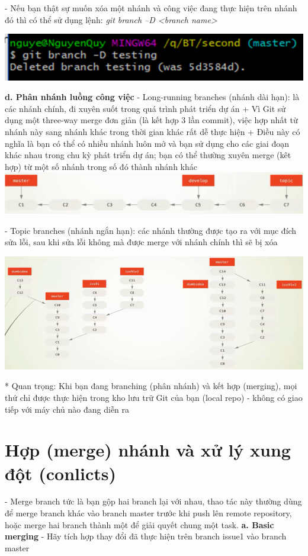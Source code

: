 \documentclass[12pt,a4paper]{report}
\begin{document}
	\label{fig:screenshot056}
\vskip 0.4cm\vskip 0.4cm
- Nếu bạn thật sự muốn xóa một nhánh và công việc đang thực hiện trên nhánh đó thì có thể sử dụng lệnh: {\it git branch –D <branch name>}\vskip 0.4cm

	\includegraphics[width=0.8\linewidth]{screenshot057}

	\label{fig:screenshot057}
\vskip 0.4cm\vskip 0.4cm
{\bf d. Phân nhánh luồng công việc}\vskip 0.4cm
- Long-running branches (nhánh dài hạn): là các nhánh chính, đi xuyên suốt trong quá trình phát triển dự án\vskip 0.4cm
+ Vì Git sử dụng một three-way merge đơn giản (là kết hợp 3 lần commit), việc hợp nhất từ nhánh này sang nhánh khác trong thời gian khác rất dễ thực hiện\vskip 0.4cm
+ Điều này có nghĩa là bạn có thể có nhiều nhánh luôn mở và bạn sử dụng cho các giai đoạn khác nhau trong chu kỳ phát triển dự án; bạn có thể thường xuyên merge (kêt hợp) từ một số nhánh trong số đó thành nhánh khác
\vskip 0.4cm
	\includegraphics[width=0.8\linewidth]{screenshot058}

	\label{fig:screenshot058}
\vskip 0.4cm\vskip 0.4cm
- Topic branches (nhánh ngắn hạn): các nhánh thường được tạo ra với mục đích sửa lỗi, sau khi sửa lỗi không mà được merge với nhánh chính thì sẽ bị xóa\vskip 0.4cm

						\includegraphics[width=0.8\linewidth]{screenshot059}
					
						\label{fig:screenshot059}
				\vskip 0.4cm\vskip 0.4cm
					* Quan trọng: Khi bạn đang branching (phân nhánh) và kết hợp (merging), mọi thứ chỉ được thực hiện trong kho lưu trữ Git của bạn (local repo) - không có giao tiếp với máy chủ nào đang diễn ra\vskip 0.4cm
					
					
					\newpage
\section{Hợp (merge) nhánh và xử lý xung đột (conlicts)}
\hspace{0.6cm}- Merge branch tức là bạn gộp hai branch lại với nhau, thao tác này thường dùng để merge branch khác vào branch master trước khi push lên remote repository, hoặc merge hai branch thành một để giải quyết chung một task.	\vskip 0.4cm
{\bf a. Basic merging}	\vskip 0.4cm
- Hãy tích hợp thay đổi đã thực hiện trên branch issue1 vào branch master	\vskip 0.4cm
\end{document}
